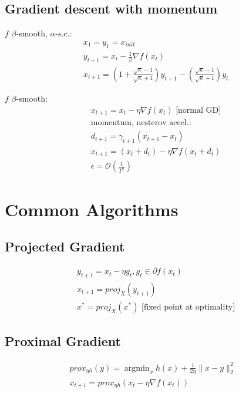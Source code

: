\documentclass[8pt,letter]{article}
\DeclareMathOperator*{\argmin}{argmin}
\begin{document}
\begin{multicols*}{2}
    \subsection {Gradient descent with momentum}
    $f$ $\beta$-smooth, $\alpha$-s.c.:
    \begin{align*}
      & x_1=y_1 = x_{init}\\
      & y_{t+1} = x_t - \frac{1}{\beta} \nabla f(x_t)\\
      & x_{t+1} = \left(1+\frac{\sqrt{\kappa}-1}{\sqrt{\kappa}+1}\right) y_{t+1} - \left(\frac{\sqrt{\kappa}-1}{\sqrt{\kappa}+1}\right) y_t
    \end{align*}

    $f$ $\beta$-smooth:
    \begin{align*}
      & x_{t+1}=x_t-\eta \nabla f(x_t) \text{ [normal GD]}\\
      & \text{momentum, nesterov accel.:}\\
      & d_{t+1} = \gamma_{t+1}(x_{t+1} - x_t)\\
      & x_{t+1} = (x_t + d_t) - \eta \nabla f(x_t + d_t)\\
      & \epsilon=\mathcal{O}\left(\frac{1}{T^2}\right)
    \end{align*}

    \vfill\null
    \pagebreak
    
    \section {Common Algorithms}

    \subsection {Projected Gradient}
    \begin{align*}
      & y_{t+1} = x_t - \eta g_t, g_t \in \partial f(x_t)\\
      & x_{t+1} = proj_{X}(y_{t+1})\\
      & x^*=proj_{X}(x^*) \text{ [fixed point at optimality]}
    \end{align*}
    
    \subsection {Proximal Gradient}
    \begin{align*}
      prox_{\eta h}(y) = \argmin_x h(x) + \frac{1}{2 \eta} \|x-y\|_2^2\\
      x_{t+1} = prox_{\eta h}(x_t - \eta \nabla f(x_t))
    \end{align*}
    

\end{multicols*}
\end{document}

